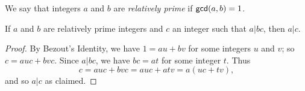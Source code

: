 \begin{dfn}
We say that integers \(a\) and \(b\) are \emph{relatively prime} if \(\mathsf{gcd}(a, b) = 1\).
\end{dfn}

\begin{thm}
If \(a\) and \(b\) are relatively prime integers and \(c\) an integer such that \(a | bc\), then \(a|c\).
\end{thm}

\begin{proof}
By Bezout's Identity, we have \(1 = au + bv\) for some integers \(u\) and \(v\); so \(c = auc + bvc\). Since \(a|bc\), we have \(bc = at\) for some integer \(t\). Thus \[ c = auc + bvc = auc + atv = a(uc + tv), \] and so \(a|c\) as claimed.
\end{proof}

